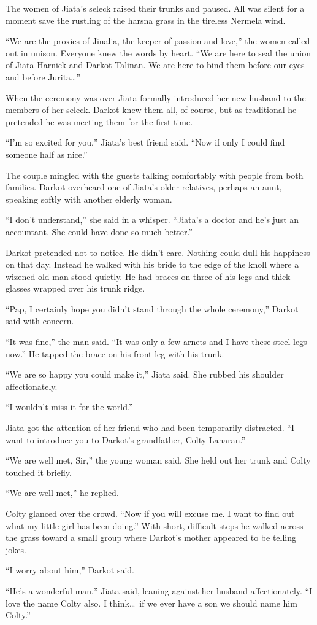 The women of Jiata's seleck raised their trunks and paused. All was silent for a moment save the
rustling of the harsna grass in the tireless Nermela wind.

``We are the proxies of Jinalia, the keeper of passion and love,'' the women called out in
unison. Everyone knew the words by heart. ``We are here to seal the union of Jiata Harnick and
Darkot Talinan. We are here to bind them before our eyes and before Jurita\ldots''

When the ceremony was over Jiata formally introduced her new husband to the members of her
seleck. Darkot knew them all, of course, but as traditional he pretended he was meeting them for
the first time.

``I'm so excited for you,'' Jiata's best friend said. ``Now if only I could find someone half as
nice.''

The couple mingled with the guests talking comfortably with people from both families. Darkot
overheard one of Jiata's older relatives, perhaps an aunt, speaking softly with another elderly
woman.

``I don't understand,'' she said in a whisper. ``Jiata's a doctor and he's just an accountant.
She could have done so much better.''

Darkot pretended not to notice. He didn't care. Nothing could dull his happiness on that day.
Instead he walked with his bride to the edge of the knoll where a wizened old man stood quietly.
He had braces on three of his legs and thick glasses wrapped over his trunk ridge.

``Pap, I certainly hope you didn't stand through the whole ceremony,'' Darkot said with concern.

``It was fine,'' the man said. ``It was only a few arnets and I have these steel legs now.'' He
tapped the brace on his front leg with his trunk.

``We are so happy you could make it,'' Jiata said. She rubbed his shoulder affectionately.

``I wouldn't miss it for the world.''

Jiata got the attention of her friend who had been temporarily distracted. ``I want to introduce
you to Darkot's grandfather, Colty Lanaran.''

``We are well met, Sir,'' the young woman said. She held out her trunk and Colty touched it
briefly.

``We are well met,'' he replied.

Colty glanced over the crowd. ``Now if you will excuse me. I want to find out what my little
girl has been doing.'' With short, difficult steps he walked across the grass toward a small
group where Darkot's mother appeared to be telling jokes.

``I worry about him,'' Darkot said.

``He's a wonderful man,'' Jiata said, leaning against her husband affectionately. ``I love the
name Colty also. I think\ldots\ if we ever have a son we should name him Colty.''
